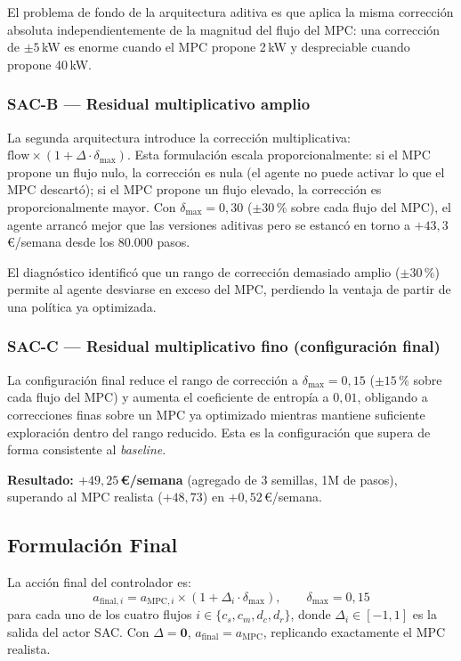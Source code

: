 \documentclass[12pt, a4paper, twoside]{report}
\begin{document}
El problema de fondo de la arquitectura aditiva es que aplica la misma
corrección absoluta independientemente de la magnitud del flujo del MPC: una
corrección de $\pm5$\,kW es enorme cuando el MPC propone 2\,kW y despreciable
cuando propone 40\,kW.

\subsubsection{SAC-B — Residual multiplicativo amplio}

La segunda arquitectura introduce la corrección multiplicativa:
$\text{flow} \times (1 + \Delta \cdot \delta_{\max})$. Esta formulación escala
proporcionalmente: si el MPC propone un flujo nulo, la corrección es nula (el
agente no puede activar lo que el MPC descartó); si el MPC propone un flujo
elevado, la corrección es proporcionalmente mayor. Con $\delta_{\max} = 0{,}30$
($\pm30\,\%$ sobre cada flujo del MPC), el agente arrancó mejor que las
versiones aditivas pero se estancó en torno a $+43{,}3$\,€/semana desde los
80.000 pasos.

El diagnóstico identificó que un rango de corrección demasiado amplio
($\pm30\,\%$) permite al agente desviarse en exceso del MPC, perdiendo la
ventaja de partir de una política ya optimizada.

\subsubsection{SAC-C — Residual multiplicativo fino (configuración final)}

La configuración final reduce el rango de corrección a $\delta_{\max} = 0{,}15$
($\pm15\,\%$ sobre cada flujo del MPC) y aumenta el coeficiente de entropía a
$0{,}01$, obligando a correcciones finas sobre un MPC ya optimizado mientras
mantiene suficiente exploración dentro del rango reducido. Esta es la
configuración que supera de forma consistente al \textit{baseline}.

\textbf{Resultado: $+49{,}25$\,€/semana} (agregado de 3 semillas, 1M de pasos),
superando al MPC realista ($+48{,}73$) en $+0{,}52$\,€/semana.

\subsection{Formulación Final}

La acción final del controlador es:
\begin{equation}
  a_{\text{final},i} = a_{\text{MPC},i} \times
  \left(1 + \Delta_i \cdot \delta_{\max}\right), \qquad \delta_{\max} = 0{,}15
  \label{eq:residual_mult}
\end{equation}
para cada uno de los cuatro flujos $i \in \{c_s, c_m, d_c, d_r\}$, donde
$\Delta_i \in [-1, 1]$ es la salida del actor SAC. Con $\Delta = \mathbf{0}$,
$a_{\text{final}} = a_{\text{MPC}}$, replicando exactamente el MPC realista.
\end{document}
